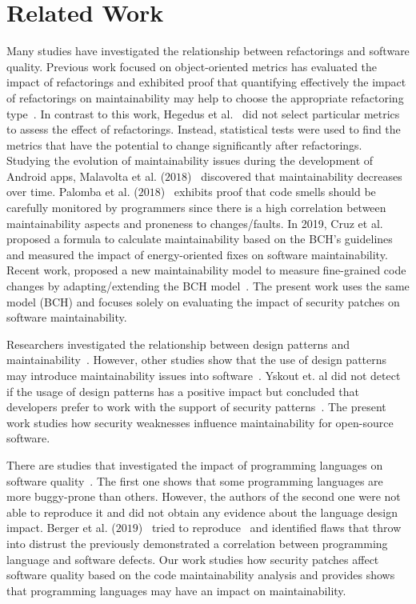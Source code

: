 \documentclass[10pt,conference]{IEEEtran}
\begin{document}
\section{Related Work}\label{sec:rw}

Many studies have investigated the relationship between refactorings and
software quality. Previous work focused on object-oriented metrics has evaluated the
impact of refactorings and exhibited proof that quantifying effectively the
impact of refactorings on maintainability may help to choose the appropriate
refactoring type~\cite{1167822}. In contrast to this work, Hegedus et
al.~\cite{HEGEDUS2018313} did not select particular metrics to assess the effect
of refactorings. Instead, statistical tests were used to find the metrics that
have the potential to change significantly after refactorings. Studying the evolution 
of maintainability issues during the development of Android apps, Malavolta et al. ($2018$)~\cite{8530041}
discovered that maintainability decreases over time. Palomba et al.
($2018$)~\cite{Palomba:2018:DIM:3231288.3231337} exhibits proof that code smells
should be carefully monitored by programmers since there is a high correlation
between maintainability aspects and proneness to changes/faults. In 2019, Cruz et 
al.~\cite{cruz2019energyoriented} proposed a formula to calculate maintainability 
based on the BCH's guidelines and measured the impact of energy-oriented fixes 
on software maintainability. Recent work,
proposed a new maintainability model to 
measure fine-grained code changes by adapting/extending the BCH model~\cite{8785997}.
The present work uses the same model (BCH) and focuses 
solely on evaluating the impact of security patches on software maintainability.

Researchers investigated the relationship between design patterns and
maintainability~\cite{10.1007/978-3-642-35267-6-18}. However, other studies show that 
the use of design patterns may introduce maintainability issues into
software~\cite{4493325}. Yskout et. al did not detect if the usage of 
design patterns has a positive impact but concluded that developers prefer to 
work with the support of security patterns~\cite{8077802}. The present work 
studies how security weaknesses influence maintainability for open-source software.

There are studies that investigated the impact of programming languages on software
quality~\cite{Ray:2014:LSS:2635868.2635922,Ray:2017:LSP:3144574.3126905}. The first
one shows that some programming languages are more buggy-prone than others. However,
the authors of the second one were not able to reproduce it and did not obtain any
evidence about the language design impact. 
Berger et al. ($2019$)~\cite{2019arXiv190110220B} tried to reproduce~\cite{Ray:2014:LSS:2635868.2635922,
Ray:2017:LSP:3144574.3126905} and identified flaws that throw into distrust the 
previously demonstrated a correlation between programming language and software 
defects. Our work studies how security patches affect software quality based 
on the code maintainability analysis and provides shows that programming languages 
may have an impact on maintainability.
\end{document}

